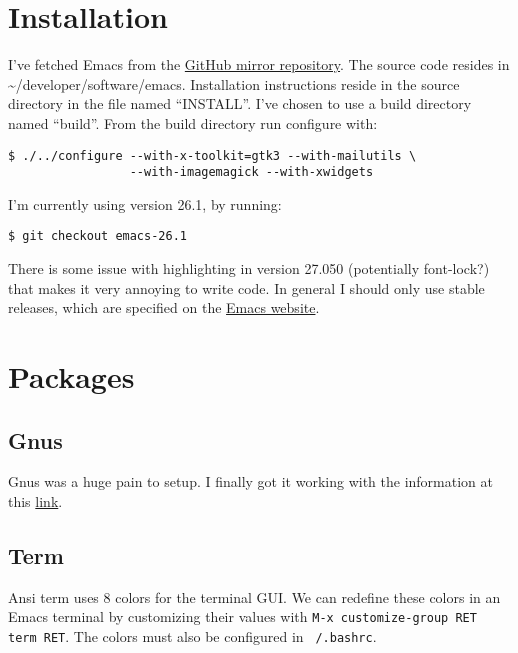\documentclass{default}
\begin{document}
\tableofcontents
\hypersetup{linkcolor=red}

\chapter{Installation}\label{cha:installation}

I've fetched Emacs from the \href{https://github.com/emacs-mirror/emacs}{GitHub mirror
  repository}. The source code resides in \textasciitilde/developer/software/emacs. Installation
instructions reside in the source directory in the file named ``INSTALL''. I've chosen to use a
build directory named ``build''. From the build directory run configure with:

\begin{verbatim}
$ ./../configure --with-x-toolkit=gtk3 --with-mailutils \
                 --with-imagemagick --with-xwidgets
\end{verbatim}

I'm currently using version 26.1, by running:

\begin{verbatim}
$ git checkout emacs-26.1
\end{verbatim}

There is some issue with highlighting in version 27.050 (potentially font-lock?) that makes it very
annoying to write code. In general I should only use stable releases, which are specified on the
\href{https://www.gnu.org/software/emacs/}{Emacs website}.

\chapter{Packages}\label{cha:packages}

\section{Gnus}
\label{sec:gnus}

Gnus was a huge pain to setup. I finally got it working with the information at this
\href{https://eschulte.github.io/emacs-starter-kit/starter-kit-gnus-imap.html}{link}.

\section{Term}\label{sec:term}

Ansi term uses 8 colors for the terminal GUI. We can redefine these colors in an Emacs terminal by
customizing their values with \texttt{M-x customize-group RET term RET}. The colors must
also be configured in \texttt{~/.bashrc}.
\end{document}
